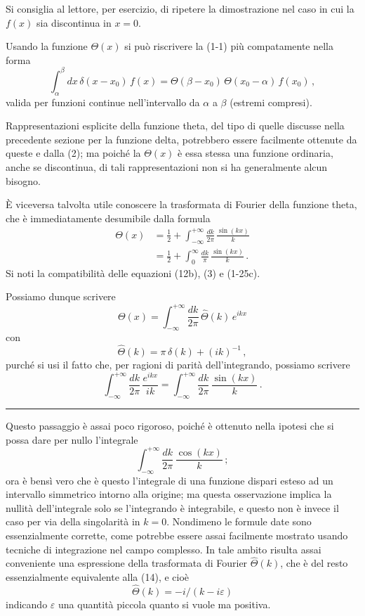 \documentclass[11pt, a4paper]{book}
\numberwithin{equation}{section}
\begin{document}
Si consiglia al lettore, per esercizio, di ripetere la dimostrazione nel caso in cui la $f(x)$ sia discontinua in $x=0$.

Usando la funzione $\Theta(x)$ si può riscrivere la (1-1) più compatamente nella forma
\begin{equation}
\int_{\alpha}^{\beta} dx\, \delta(x - x_0)\, f(x) = \Theta(\beta - x_0)\,\Theta(x_0 - \alpha)\, f(x_0) \,, \tag{11}
\end{equation}
valida per funzioni continue nell'intervallo da $\alpha$ a $\beta$ (estremi compresi).

Rappresentazioni esplicite della funzione theta, del tipo di quelle discusse nella precedente sezione per la funzione delta, potrebbero essere facilmente ottenute da queste e dalla (2); ma poiché la $\Theta(x)$ è essa stessa una funzione ordinaria, anche se discontinua, di tali rappresentazioni non si ha generalmente alcun bisogno.

È viceversa talvolta utile conoscere la trasformata di Fourier della funzione theta, che è immediatamente desumibile dalla formula
\begin{align}
\Theta(x) &= \frac{1}{2} + \int_{-\infty}^{+\infty} \frac{dk}{2\pi}\, \frac{\sin(kx)}{k} \tag{12a} \\
&= \frac{1}{2} + \int_{0}^{\infty} \frac{dk}{\pi}\, \frac{\sin(kx)}{k} \,. \tag{12b}
\end{align}
Si noti la compatibilità delle equazioni (12b), (3) e (1-25c).

Possiamo dunque scrivere
\begin{equation}
\Theta(x) = \int_{-\infty}^{+\infty} \frac{dk}{2\pi}\, \hat{\Theta}(k)\, e^{ikx} \tag{13}
\end{equation}
con
\begin{equation}
\hat{\Theta}(k) = \pi\,\delta(k) + (ik)^{-1} \,, \tag{14}
\end{equation}
purché si usi il fatto che, per ragioni di parità dell'integrando, possiamo scrivere
\begin{equation}
\int_{-\infty}^{+\infty} \frac{dk}{2\pi}\, \frac{e^{ikx}}{ik} = \int_{-\infty}^{+\infty} \frac{dk}{2\pi}\, \frac{\sin(kx)}{k} \,. \tag{15}
\end{equation}

\medskip\noindent\rule{\linewidth}{0.4pt}

Questo passaggio è assai poco rigoroso, poiché è ottenuto nella ipotesi che si possa dare per nullo l'integrale
\[
\int_{-\infty}^{+\infty} \frac{dk}{2\pi}\, \frac{\cos(kx)}{k} \,;
\]
ora è bensì vero che è questo l'integrale di una funzione dispari esteso ad un intervallo simmetrico intorno alla origine; ma questa osservazione implica la nullità dell'integrale solo se l'integrando è integrabile, e questo non è invece il caso per via della singolarità in $k = 0$. Nondimeno le formule date sono essenzialmente corrette, come potrebbe essere assai facilmente mostrato usando tecniche di integrazione nel campo complesso. In tale ambito risulta assai conveniente una espressione della trasformata di Fourier $\hat{\Theta}(k)$, che è del resto essenzialmente equivalente alla (14), e cioè
\[
\hat{\Theta}(k) = -i/(k - i\varepsilon)
\]
indicando $\varepsilon$ una quantità piccola quanto si vuole ma positiva.
\end{document}
